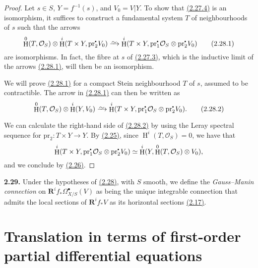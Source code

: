 \documentclass{report}
\newenvironment{rmenv}[1]
  {\phantomsection\par\medskip\noindent\textbf{#1.}\rmfamily}
  {\medskip}
\renewcommand{\cal}[1]{{\mathcal{#1}}}
\newcommand{\sbullet}{{\mathbin{\vcenter{\hbox{\scalebox{.5}{$\bullet$}}}}}}
\newcommand{\pr}{\mathrm{pr}}
\newcommand{\RR}{\mathbf{R}}
\newcommand{\simto}{\xrightarrow{\raisebox{-0.7ex}[0ex][0ex]{$\sim$}}}
\DeclareMathOperator{\HH}{H}
\newcommand{\oldpage}[1]{\marginpar{\footnotesize$\Big\vert$ \textit{p.~#1}}}
\begin{document}
\begin{proof}
  Let $s\in S$, $Y=f^{-1}(s)$, and $V_0=V|Y$.
  To show that \hyperref[I.2.27.4]{(2.27.4)} is an isomorphism, it suffices to construct a fundamental system $T$ of neighbourhoods of $s$ such that the arrows
  \[
  \label{I.2.28.1}
    \HH^0(T,\cal{O}_S) \otimes \HH^i(T\times Y,\pr_2^\sbullet V_0) \simto \HH^i(T\times Y,\pr_1^\sbullet\cal{O}_S \otimes \pr_2^\sbullet V_0)
  \tag{2.28.1}
  \]
  are isomorphisms.
  In fact, the fibre at $s$ of \hyperref[I.2.27.3]{(2.27.3)}, which is the inductive limit of the arrows \hyperref[I.2.28.1]{(2.28.1)}, will then be an isomorphism.

  We will prove \hyperref[I.2.28.1]{(2.28.1)} for a compact Stein neighbourhood $T$ of $s$, assumed to be contractible.
  The arrow in \hyperref[I.2.28.1]{(2.28.1)} can then be written as
\oldpage{21}
  \[
  \label{I.2.28.2}
    \HH^0(T,\cal{O}_S) \otimes \HH^i(Y,V_0) \simto \HH^i(T\times Y,\pr_1^\sbullet\cal{O}_S \otimes \pr_2^\sbullet V_0).
  \tag{2.28.2}
  \]

  We can calculate the right-hand side of \hyperref[I.2.28.2]{(2.28.2)} by using the Leray spectral sequence for $\pr_2\colon T\times Y\to Y$.
  By \hyperref[I.2.25]{(2.25)}, since $\HH^i(T,\cal{O}_S)=0$, we have that
  \[
    \HH^i(T\times Y,\pr_1^\sbullet\cal{O}_S \otimes \pr_2^\sbullet V_0) \simeq \HH^i(Y,\HH^0(T,\cal{O}_S) \otimes V_0),
  \]
  and we conclude by \hyperref[I.2.26]{(2.26)}.
\end{proof}

\begin{rmenv}{2.29}
\label{I.2.29}
  Under the hypotheses of \hyperref[I.2.28]{(2.28)}, with $S$ smooth, we define the \emph{Gauss--Manin connection} on $\RR^i f_*\Omega_{X/S}^\bullet(V)$ as being the unique integrable connection that admits the local sections of $\RR^i f_*V$ as its horizontal sections \hyperref[I.2.17]{(2.17)}.
\end{rmenv}



\section{Translation in terms of first-order partial differential equations}
\label{I.3}
\end{document}
